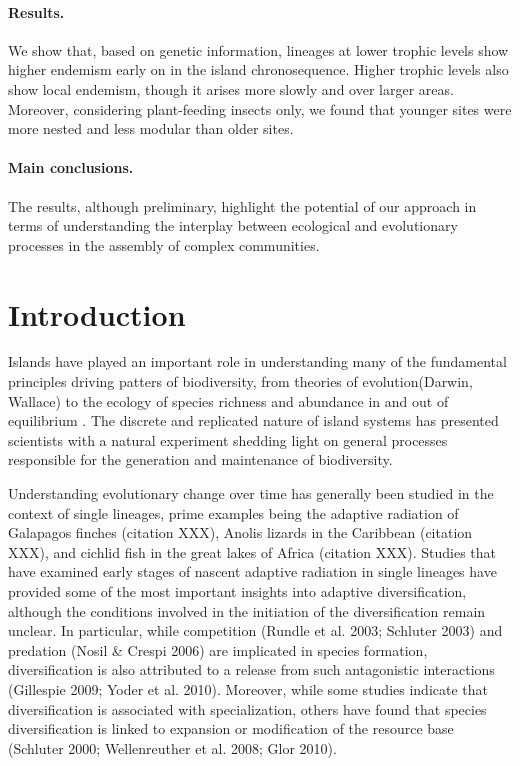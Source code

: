 \documentclass[12pt]{article}
\begin{document}
\paragraph{Results.}
We show that, based on genetic information, lineages at lower trophic
levels show higher endemism early on in the island
chronosequence. Higher trophic levels also show local endemism, though
it arises more slowly and over larger areas. Moreover, considering
plant-feeding insects only, we found that younger sites were more
nested and less modular than older sites.

\paragraph{Main conclusions.}
The results, although preliminary, highlight the potential of our
approach in terms of understanding the interplay between ecological
and evolutionary processes in the assembly of complex communities.

\section*{Introduction}

Islands have played an important role in understanding many of the
fundamental principles driving patters of biodiversity, from theories
of evolution(Darwin, Wallace) to the ecology of species richness
and abundance in and out of equilibrium \citep{macWilson, brown1995,
  rosindell2011}. The discrete and replicated nature of island systems has
presented scientists with a natural experiment shedding light on
general processes responsible for the generation and maintenance of
biodiversity.

Understanding evolutionary change over time has generally been studied
in the context of single lineages, prime examples being the adaptive
radiation of Galapagos finches (citation XXX), Anolis lizards in the
Caribbean (citation XXX), and cichlid fish in the great lakes of
Africa (citation XXX). Studies that have examined early stages of
nascent adaptive radiation in single lineages have provided some of
the most important insights into adaptive diversification, although
the conditions involved in the initiation of the diversification
remain unclear. In particular, while competition (Rundle et al. 2003;
Schluter 2003) and predation (Nosil \& Crespi 2006) are implicated in
species formation, diversification is also attributed to a release
from such antagonistic interactions (Gillespie 2009; Yoder et
al. 2010). Moreover, while some studies indicate that diversification
is associated with specialization, others have found that species
diversification is linked to expansion or modification of the resource
base (Schluter 2000; Wellenreuther et al. 2008; Glor 2010). 
\end{document}
